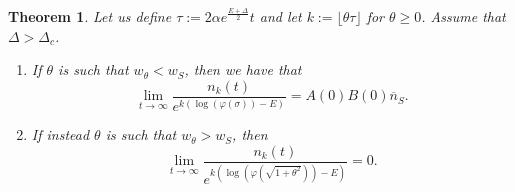 \documentclass{article}
\numberwithin{equation}{section}
\theoremstyle{plain}
\newtheorem{theorem}{Theorem}[section]
\begin{document}
\begin{theorem} \label{theo:half line asymptotics delta supercrit}
Let us define $\tau:= 2 \alpha e^{\frac{E+ \Delta }{2}} t$ and let $k:=\lfloor \theta \tau \rfloor$ for  $\theta \geq 0$.
    Assume that $\Delta > \Delta_c $. 
    \begin{enumerate} 
\item If $\theta $ is such that $w_\theta < w_S $, then we have that  
     \begin{equation}\label{asympt half superc thetha small}
    \lim_{t \to \infty } \frac{ n_{k} (t) }{ e^{k( \log(\varphi(\sigma))- E ) } } = A(0) B(0) \overline n_S  .
    \end{equation}
 \item    If instead $\theta $ is such that  $w_\theta  >w_S  $, then 
     \begin{equation}\label{asympt half superc thetha large}
    \lim_{t \to \infty } \frac{ n_{k} (t) }{ e^{k( \log(\varphi(\sqrt{1+\theta^2 }))- E ) } } = 0.
    \end{equation}
    \end{enumerate}
\end{theorem}
\end{document}
